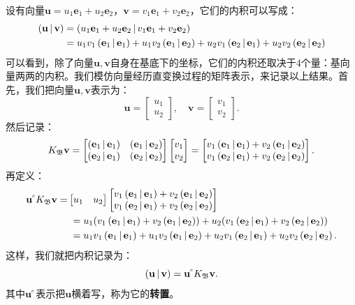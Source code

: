 \documentclass[12pt,UTF8]{ctexbook}
\begin{document}
设有向量$\mathbf{u} = u_1\mathbf{e}_1 + u_2\mathbf{e}_2$，$\mathbf{v} = v_1\mathbf{e}_1 + v_2\mathbf{e}_2$，它们的内积可以写成：
\begin{align*}
    \displaystyle\left( \mathbf{u} \,|\, \mathbf{v} \right) &= \displaystyle\left( u_1\mathbf{e}_1 + u_2\mathbf{e}_2 \,|\, v_1\mathbf{e}_1 + v_2\mathbf{e}_2 \right) \\
    &= u_1v_1 \displaystyle\left( \mathbf{e}_1 \,|\, \mathbf{e}_1 \right) + u_1v_2 \displaystyle\left( \mathbf{e}_1 \,|\, \mathbf{e}_2 \right) + u_2v_1 \displaystyle\left( \mathbf{e}_2 \,|\, \mathbf{e}_1 \right) + u_2v_2 \displaystyle\left( \mathbf{e}_2 \,|\, \mathbf{e}_2 \right) \\
\end{align*}
可以看到，除了向量$\mathbf{u}, \mathbf{v}$自身在基底下的坐标，它们的内积还取决于$4$个量：基向量两两的内积。我们模仿向量经历直变换过程的矩阵表示，来记录以上结果。首先，我们把向量$\mathbf{u}, \mathbf{v}$表示为：
$$ \mathbf{u} = \begin{bmatrix}
    u_1\\ u_2
\end{bmatrix},\quad \mathbf{v} = \begin{bmatrix}
    v_1\\ v_2
\end{bmatrix}. $$
然后记录：
$$ K_{\mathfrak{B}} \mathbf{v} = \begin{bmatrix}
     \displaystyle\left( \mathbf{e}_1 \,|\, \mathbf{e}_1 \right) & \displaystyle\left( \mathbf{e}_1 \,|\, \mathbf{e}_2 \right) \\ \displaystyle\left( \mathbf{e}_2 \,|\, \mathbf{e}_1 \right) & \displaystyle\left( \mathbf{e}_2 \,|\, \mathbf{e}_2 \right)
\end{bmatrix}\begin{bmatrix}
    v_1\\ v_2
\end{bmatrix} = \begin{bmatrix}
    v_1\displaystyle\left( \mathbf{e}_1 \,|\, \mathbf{e}_1 \right) + v_2\displaystyle\left( \mathbf{e}_1 \,|\, \mathbf{e}_2 \right)\\ v_1\displaystyle\left( \mathbf{e}_2 \,|\, \mathbf{e}_1 \right) + v_2\displaystyle\left( \mathbf{e}_2 \,|\, \mathbf{e}_2 \right)
\end{bmatrix}.$$
再定义：
\begin{align*}
    \mathbf{u}^{\tr} K_{\mathfrak{B}} \mathbf{v} =& \begin{bmatrix}
        u_1 & u_2
    \end{bmatrix}\begin{bmatrix}
        v_1\nji{\mathbf{e}_1}{\mathbf{e}_1} + v_2\nji{\mathbf{e}_1}{\mathbf{e}_2}\\ v_1\nji{\mathbf{e}_2}{\mathbf{e}_1} + v_2\nji{\mathbf{e}_2}{\mathbf{e}_2}
    \end{bmatrix} \\
    &\;= u_1 (v_1\nji{\mathbf{e}_1}{\mathbf{e}_1} + v_2\nji{\mathbf{e}_1}{\mathbf{e}_2}) + u_2 (v_1\nji{\mathbf{e}_2}{\mathbf{e}_1} + v_2\nji{\mathbf{e}_2}{\mathbf{e}_2}) \\
    &\;= u_1v_1 \nji{\mathbf{e}_1}{\mathbf{e}_1} + u_1v_2\nji{\mathbf{e}_1}{\mathbf{e}_2} + u_2v_1\nji{\mathbf{e}_2}{\mathbf{e}_1} + u_2v_2\nji{\mathbf{e}_2}{\mathbf{e}_2}.
\end{align*}
这样，我们就把内积记录为：
$$ \nji{\mathbf{u}}{\mathbf{v}} = \mathbf{u}^{\tr} K_{\mathfrak{B}} \mathbf{v}. $$
其中$\mathbf{u}^{\tr}$表示把$\mathbf{u}$横着写，称为它的\textbf{转置}。
\end{document}
